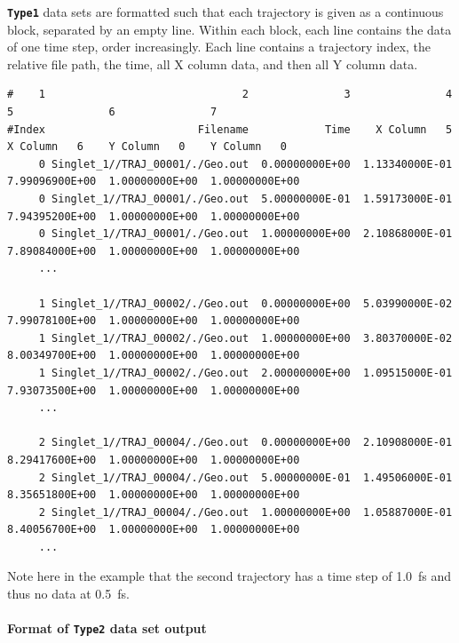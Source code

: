 \documentclass[a4paper,10pt,DIV=15,openany]{scrbook}
\newcommand{\ttt}[1]{\textbf{\texttt{#1}}}
\newenvironment{example}{
  \setlength{\OuterFrameSep}{3pt}
  \vspace{0mm}
  \definecolor{shadecolor}{HTML}{E4F4FF}
  \begin{shaded}
}{
  \end{shaded}
}
\begin{document}
\ttt{Type1} data sets are formatted such that each trajectory is given as a continuous block, separated by an empty line.
Within each block, each line contains the data of one time step, order increasingly.
Each line contains a trajectory index, the relative file path, the time, all X column data, and then all Y column data.
\begin{example}
\footnotesize\begin{verbatim}
#    1                               2               3               4               5               6               7
#Index                        Filename            Time    X Column   5    X Column   6    Y Column   0    Y Column   0
     0 Singlet_1//TRAJ_00001/./Geo.out  0.00000000E+00  1.13340000E-01  7.99096900E+00  1.00000000E+00  1.00000000E+00
     0 Singlet_1//TRAJ_00001/./Geo.out  5.00000000E-01  1.59173000E-01  7.94395200E+00  1.00000000E+00  1.00000000E+00
     0 Singlet_1//TRAJ_00001/./Geo.out  1.00000000E+00  2.10868000E-01  7.89084000E+00  1.00000000E+00  1.00000000E+00
     ...

     1 Singlet_1//TRAJ_00002/./Geo.out  0.00000000E+00  5.03990000E-02  7.99078100E+00  1.00000000E+00  1.00000000E+00
     1 Singlet_1//TRAJ_00002/./Geo.out  1.00000000E+00  3.80370000E-02  8.00349700E+00  1.00000000E+00  1.00000000E+00  
     1 Singlet_1//TRAJ_00002/./Geo.out  2.00000000E+00  1.09515000E-01  7.93073500E+00  1.00000000E+00  1.00000000E+00 
     ...

     2 Singlet_1//TRAJ_00004/./Geo.out  0.00000000E+00  2.10908000E-01  8.29417600E+00  1.00000000E+00  1.00000000E+00
     2 Singlet_1//TRAJ_00004/./Geo.out  5.00000000E-01  1.49506000E-01  8.35651800E+00  1.00000000E+00  1.00000000E+00
     2 Singlet_1//TRAJ_00004/./Geo.out  1.00000000E+00  1.05887000E-01  8.40056700E+00  1.00000000E+00  1.00000000E+00
     ...
\end{verbatim}
\end{example}
Note here in the example that the second trajectory has a time step of 1.0~fs and thus no data at 0.5~fs.

\paragraph{Format of \ttt{Type2} data set output}
\end{document}
